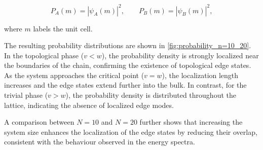 \documentclass[11pt, a4paper]{article}
\begin{document}
\begin{equation}
P_A(m)=|\psi_A(m)|^2,
\qquad
P_B(m)=|\psi_B(m)|^2,
\end{equation}

where \(m\) labels the unit cell.

The resulting probability distributions are shown in \cref{fig:probability_n=10_20}. In the topological phase (\(v<w\)), the probability density is strongly localized near the boundaries of the chain, confirming the existence of topological edge states. As the system approaches the critical point (\(v=w\)), the localization length increases and the edge states extend further into the bulk. In contrast, for the trivial phase (\(v>w\)), the probability density is distributed throughout the lattice, indicating the absence of localized edge modes.

A comparison between \(N=10\) and \(N=20\) further shows that increasing the system size enhances the localization of the edge states by reducing their overlap, consistent with the behaviour observed in the energy spectra.
\end{document}
